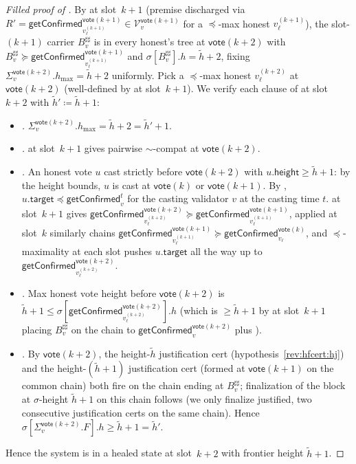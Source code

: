 \ifx\litemode\undefined\documentclass{article}\fi
\newcommand{\V}[0]{\ensuremath{\mathcal{V}}}
\newcommand{\target}{\mathsf{target}}
\newcommand{\height}{\mathsf{height}}
\newcommand{\hmax}{\ensuremath{h_{\max}}\xspace}
\newcommand{\vote}{\ensuremath{\mathsf{vote}}}
\newcommand{\comm}[1]{\ensuremath{\widetilde{#1}}}
\newcommand{\getConfirmed}{\textsf{getConfirmed}\xspace}
\theoremstyle{plain}
\theoremstyle{definition}
\theoremstyle{remark}
\begin{document}
\begin{proof}[Filled proof of ]
By  at slot~$k+1$ (premise discharged via $R' = \getConfirmed_{v_\ell^{(k+1)}}^{\vote(k+1)} \in \V_v^{\vote(k+1)}$ for a $\preceq$-max honest $v_\ell^{(k+1)}$), the slot-$(k+1)$ carrier $B^{\sharp\sharp}_v$ is in every honest's tree at $\vote(k+2)$ with $B^{\sharp\sharp}_v \succeq \getConfirmed_{v_\ell^{(k+1)}}^{\vote(k+1)}$ and $\sigma[B^{\sharp\sharp}_v].h = \comm{h}+2$, fixing $\Sigma_v^{\vote(k+2)}.\hmax = \comm{h}+2$ uniformly.
Pick a $\preceq$-max honest $v_\ell^{(k+2)}$ at $\vote(k+2)$ (well-defined by  at slot~$k+1$).
We verify each clause of  at slot~$k+2$ with $\comm{h}' \coloneqq \comm{h}+1$:
\begin{itemize}
  \item \emph{.} $\Sigma_v^{\vote(k+2)}.\hmax = \comm{h}+2 = \comm{h}'+1$.
  \item \emph{.}  at slot~$k+1$ gives pairwise $\sim$-compat at $\vote(k+2)$.
  \item \emph{.} An honest vote $u$ cast strictly before $\vote(k+2)$ with $u.\height \geq \comm{h}+1$: by the height bounds, $u$ is cast at $\vote(k)$ or $\vote(k+1)$. By , $u.\target \preceq \getConfirmed_v^{t}$ for the casting validator $v$ at the casting time $t$.  at slot~$k+1$ gives $\getConfirmed_{v_\ell^{(k+2)}}^{\vote(k+2)} \succeq \getConfirmed_{v_\ell^{(k+1)}}^{\vote(k+1)}$, applied at slot~$k$ similarly chains $\getConfirmed_{v_\ell^{(k+1)}}^{\vote(k+1)} \succeq \getConfirmed_{v_\ell}^{\vote(k)}$, and $\preceq$-maximality at each slot pushes $u.\target$ all the way up to $\getConfirmed_{v_\ell^{(k+2)}}^{\vote(k+2)}$.
  \item \emph{.} Max honest vote height before $\vote(k+2)$ is $\comm{h}+1 \leq \sigma[\getConfirmed_{v_\ell^{(k+2)}}^{\vote(k+2)}].h$ (which is $\geq \comm{h}+1$ by  at slot~$k+1$ placing $B^{\sharp\sharp}_v$ on the chain to $\getConfirmed_v^{\vote(k+2)}$ plus ).
  \item \emph{.} By $\vote(k+2)$, the height-$\comm{h}$ justification cert (hypothesis~\ref{rev:hfcert:hj}) and the height-$(\comm{h}+1)$ justification cert (formed at $\vote(k+1)$ on the common chain) both fire on the chain ending at $B^{\sharp\sharp}_v$; finalization of the block at $\sigma$-height $\comm{h}+1$ on this chain follows (we only finalize justified, two consecutive justification certs on the same chain). Hence $\sigma[\Sigma_v^{\vote(k+2)}.F].h \geq \comm{h}+1 = \comm{h}'$.
\end{itemize}
Hence the system is in a healed state at slot~$k+2$ with frontier height $\comm{h}+1$.
\end{proof}
\end{document}
